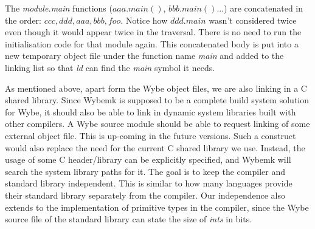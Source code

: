The \textit{module.main} functions ($aaa.main()$, $bbb.main()$...) are
concatenated in the order: $ccc,ddd,aaa,bbb,foo$. Notice how $ddd.main$ wasn't
considered twice even though it would appear twice in the traversal. There is
no need to run the initialisation code for that module again. This concatenated
body is put into a new temporary object file under the function name
\textit{main} and added to the linking list so that \textit{ld} can find the
\textit{main} symbol it needs.


As mentioned above, apart form the Wybe object files, we are also linking in a
C shared library. Since Wybemk is supposed to be a complete build system
solution for Wybe, it should also be able to link in dynamic system libraries
built with other compilers. A Wybe source module should be able to request
linking of some external object file. This is up-coming in the future
versions. Such a construct would also replace the need for the current C shared
library we use. Instead, the usage of some C header/library can be explicitly
specified, and Wybemk will search the system library paths for it. The goal is
to keep the compiler and standard library independent. This is similar to how
many languages provide their standard library separately from the compiler. Our
independence also extends to the implementation of primitive types in the
compiler, since the Wybe source file of the standard library can state the size
of \textit{ints} in bits.





